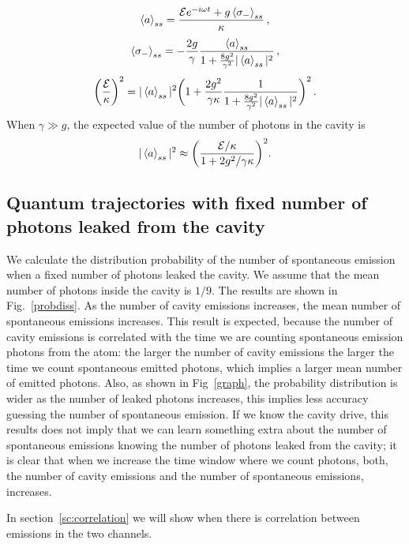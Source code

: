 \documentclass[%
 reprint,
 amsmath,amssymb,
 aps, 
]{revtex4-1}
\begin{document}
\begin{equation} \label{chaf1}
\expval{a}_{ss} = \frac{\mathcal{E}e^{-i\omega t} +
  g\expval{\sigma_-}_{ss}}{\kappa}\, ,
\end{equation}
\begin{equation} \label{chaf2}
\expval{\sigma_-}_{ss} = -\frac{2g}{\gamma}\frac{\expval{a}_{ss}}{1 +
  \frac{8g^2}{\gamma^2}|\expval{a}_{ss}|^2}\, ,
\end{equation}
\begin{equation}
\bigg(\frac{\mathcal{E}}{\kappa}\bigg)^2 = |\expval{a}_{ss}|^2 \bigg(1
+ \frac{2g^2}{\gamma \kappa}\frac{1}{1 +
  \frac{8g^2}{\gamma^2}|\expval{a}_{ss}|^2}\bigg)^2\, .
\end{equation}
When $\gamma \gg g$, the expected value of the number of photons in
the cavity is 
\begin{equation} \label{numfo}
|\expval{a}_{ss}|^2 \approx \bigg(\frac{\mathcal{E}/\kappa}{1 + 2g^2/\gamma \kappa}\bigg)^2.
\end{equation}


\subsection{Quantum trajectories with fixed number of photons leaked from the cavity}
We calculate the distribution probability of the number of spontaneous
emission when a fixed number of photons leaked the cavity. We assume
that the mean number of photons inside the cavity is $1/9$. The
results are shown in Fig.~\ref{probdiss}. As the number of cavity
emissions increases, the mean number of spontaneous emissions
increases. This result is expected, because the number of cavity
emissions is correlated with the time we are counting spontaneous
emission photons from the atom: the larger the number of cavity
emissions the larger the time we count spontaneous emitted photons,
which implies a larger mean number of emitted photons. Also, as shown
in Fig~\ref{graph}, the probability distribution is wider as the
number of leaked photons increases, this implies less accuracy
guessing the number of spontaneous emission. If we know the cavity
drive, this results does not imply that we can learn something extra
about the number of spontaneous emissions knowing the number of
photons leaked from the cavity; it is clear that when we increase the
time window where we count photons, both, the number of cavity emissions
and the number of spontaneous emissions, increases.

In section~\ref{sc:correlation} we will show
when there is correlation between emissions in the two channels.
\end{document}
